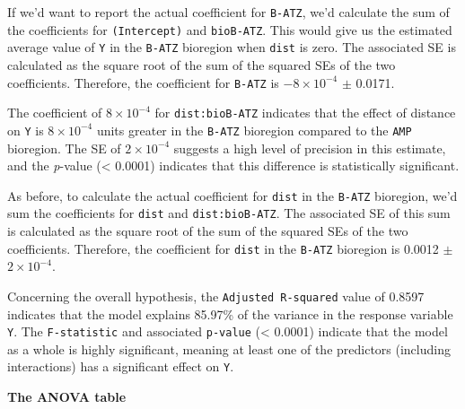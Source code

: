 \documentclass[
  letterpaper,
]{book}
\begin{document}
If we'd want to report the actual coefficient for \texttt{B-ATZ}, we'd
calculate the sum of the coefficients for \texttt{(Intercept)} and
\texttt{bioB-ATZ}. This would give us the estimated average value of
\texttt{Y} in the \texttt{B-ATZ} bioregion when \texttt{dist} is zero.
The associated SE is calculated as the square root of the sum of the
squared SEs of the two coefficients. Therefore, the coefficient for
\texttt{B-ATZ} is \ensuremath{-8\times 10^{-4}} \(\pm\) 0.0171.

The coefficient of \ensuremath{8\times 10^{-4}} for
\texttt{dist:bioB-ATZ} indicates that the effect of distance on
\texttt{Y} is \ensuremath{8\times 10^{-4}} units greater in the
\texttt{B-ATZ} bioregion compared to the \texttt{AMP} bioregion. The SE
of \ensuremath{2\times 10^{-4}} suggests a high level of precision in
this estimate, and the \emph{p}-value (\textless{} 0.0001) indicates
that this difference is statistically significant.

As before, to calculate the actual coefficient for \texttt{dist} in the
\texttt{B-ATZ} bioregion, we'd sum the coefficients for \texttt{dist}
and \texttt{dist:bioB-ATZ}. The associated SE of this sum is calculated
as the square root of the sum of the squared SEs of the two
coefficients. Therefore, the coefficient for \texttt{dist} in the
\texttt{B-ATZ} bioregion is 0.0012 \(\pm\) \ensuremath{2\times 10^{-4}}.

Concerning the overall hypothesis, the \texttt{Adjusted\ R-squared}
value of 0.8597 indicates that the model explains 85.97\% of the
variance in the response variable \texttt{Y}. The \texttt{F-statistic}
and associated \texttt{p-value} (\textless{} 0.0001) indicate that the
model as a whole is highly significant, meaning at least one of the
predictors (including interactions) has a significant effect on
\texttt{Y}.

\textbf{The ANOVA table}
\end{document}
